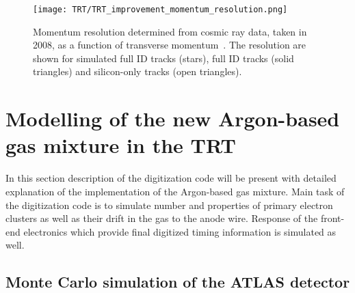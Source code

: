 \begin{figure}
\centering
\texttt{[image: TRT/TRT\_improvement\_momentum\_resolution.png]}
\caption{ 
Momentum resolution determined from cosmic ray data, taken in 2008, as a function of transverse momentum~\cite{Aad:2010bx}.
The resolution are shown for simulated full ID tracks (stars), full ID tracks (solid triangles) and silicon-only tracks (open triangles).
}
\label{fig:improvement_of_momentum_resolution}
\end{figure}



\section{Modelling of the new Argon-based gas mixture in the TRT}
\label{sec:digi_argon}

In this section description of the digitization code will be present with detailed explanation of the implementation of the Argon-based gas mixture.
Main task of the digitization code is to simulate number and properties of primary electron clusters as well as their drift in the gas to the anode wire.
Response of the front-end electronics which provide final digitized timing information is simulated as well.

\subsection{Monte Carlo simulation of the ATLAS detector}

